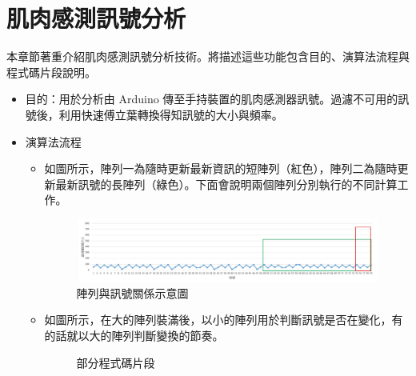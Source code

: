 \documentclass[12pt]{article}  %
\theoremstyle{plain}
\begin{document}
\section{肌肉感測訊號分析}
本章節著重介紹肌肉感測訊號分析技術。將描述這些功能包含目的、演算法流程與程式碼片段說明。

\begin{itemize}
\item 目的：用於分析由 Arduino 傳至手持裝置的肌肉感測器訊號。過濾不可用的訊號後，利用快速傅立葉轉換得知訊號的大小與頻率。
\item 演算法流程
\begin{itemize}
\item 如圖所示，陣列一為隨時更新最新資訊的短陣列（紅色），陣列二為隨時更新最新訊號的長陣列（綠色）。下面會說明兩個陣列分別執行的不同計算工作。
\begin{figure}[h]  %
\centering
\includegraphics[width=15cm]{pic/ch3/陣列與訊號關係示意圖.JPG}
\caption{陣列與訊號關係示意圖}
\end{figure}

\item 如圖所示，在大的陣列裝滿後，以小的陣列用於判斷訊號是否在變化，有的話就以大的陣列判斷變換的節奏。
\begin{figure}[h]  %
\quad
{}
\caption{部分程式碼片段}
\end{figure}


\end{itemize}
\end{itemize}
\end{document}
